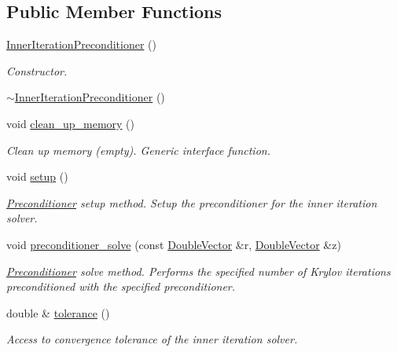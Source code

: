 \subsection*{Public Member Functions}
\begin{DoxyCompactItemize}
\item 
\hyperlink{classoomph_1_1InnerIterationPreconditioner_a467e8545ac2dd8650d22847c95122bee}{Inner\+Iteration\+Preconditioner} ()
\begin{DoxyCompactList}\small\item\em Constructor. \end{DoxyCompactList}\item 
\hyperlink{classoomph_1_1InnerIterationPreconditioner_a6d771bae31ff01e9f9b4578208acae14}{$\sim$\+Inner\+Iteration\+Preconditioner} ()
\item 
void \hyperlink{classoomph_1_1InnerIterationPreconditioner_a15c06204c6555fc4228fda0c71fcfce8}{clean\+\_\+up\+\_\+memory} ()
\begin{DoxyCompactList}\small\item\em Clean up memory (empty). Generic interface function. \end{DoxyCompactList}\item 
void \hyperlink{classoomph_1_1InnerIterationPreconditioner_a0c20b28ab82a5d7f277c9afef8e99287}{setup} ()
\begin{DoxyCompactList}\small\item\em \hyperlink{classoomph_1_1Preconditioner}{Preconditioner} setup method. Setup the preconditioner for the inner iteration solver. \end{DoxyCompactList}\item 
void \hyperlink{classoomph_1_1InnerIterationPreconditioner_a6d30ced26206cb866f9ae51cc4caebae}{preconditioner\+\_\+solve} (const \hyperlink{classoomph_1_1DoubleVector}{Double\+Vector} \&r, \hyperlink{classoomph_1_1DoubleVector}{Double\+Vector} \&z)
\begin{DoxyCompactList}\small\item\em \hyperlink{classoomph_1_1Preconditioner}{Preconditioner} solve method. Performs the specified number of Krylov iterations preconditioned with the specified preconditioner. \end{DoxyCompactList}\item 
double \& \hyperlink{classoomph_1_1InnerIterationPreconditioner_a5b5eff9d8ce065d88f328c7d028ed578}{tolerance} ()
\begin{DoxyCompactList}\small\item\em Access to convergence tolerance of the inner iteration solver. \end{DoxyCompactList}\item 

\end{DoxyCompactItemize}
